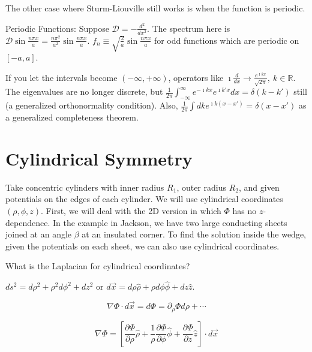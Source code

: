 \documentclass[a4paper,twoside,master.tex]{subfiles}
\begin{document}
The other case where Sturm-Liouville still works is when the function is periodic.

\begin{ex}
    Periodic Functions:
Suppose $\mathcal{D} = -\frac{d^2}{dx^2}$. The spectrum here is $\mathcal{D}\sin\frac{n\pi x}{a} = \frac{n\pi^2}{a^2}\sin\frac{n\pi x}{a}$. $f_n\equiv\sqrt{\frac{2}{a}}\sin\frac{n\pi x}{a}$ for odd functions which are periodic on $[-a,a]$.

If you let the intervals become $(-\infty,+\infty)$, operators like $\imath\frac{d}{dx}\to \frac{e^{\imath k x}}{\sqrt{2\pi}},\ k\in\mathbb{R}$. The eigenvalues are no longer discrete, but $\frac{1}{2\pi}\int_{-\infty}^\infty e^{-\imath kx}e^{\imath k'x}dx = \delta(k-k')$ still (a generalized orthonormality condition). Also, $\frac{1}{2\pi}\int dk e^{\imath k (x-x')} = \delta(x-x')$ as a generalized completeness theorem.
\end{ex}

\section{Cylindrical Symmetry}%
\label{sec:cylindrical_symmetry}

Take concentric cylinders with inner radius $R_1$, outer radius $R_2$, and given potentials on the edges of each cylinder. We will use cylindrical coordinates $(\rho,\phi,z)$. First, we will deal with the 2D version in which $\Phi$ has no $z$-dependence. In the example in Jackson, we have two large conducting sheets joined at an angle $\beta$ at an insulated corner. To find the solution inside the wedge, given the potentials on each sheet, we can also use cylindrical coordinates.

What is the Laplacian for cylindrical coordinates?

$ds^2 = d\rho^2+\rho^2d\phi^2+dz^2$ or $d\vec{x}=d\rho\hat{\rho} + \rho d\phi\hat{\phi}+dz\hat{z}$.

\begin{equation}
   \nabla\Phi\cdot d\vec{x} = d\Phi = \partial_\rho\Phi d\rho +\cdots
\end{equation}

\begin{equation}
   \nabla\Phi = [\frac{\partial\Phi}{\partial\rho}\hat{\rho} + \frac{1}{\rho}\frac{\partial\Phi}{\partial\phi}\hat{\phi}+\frac{\partial\Phi}{\partial z}\hat{z}]\cdot d\vec{x}
\end{equation}
\end{document}
